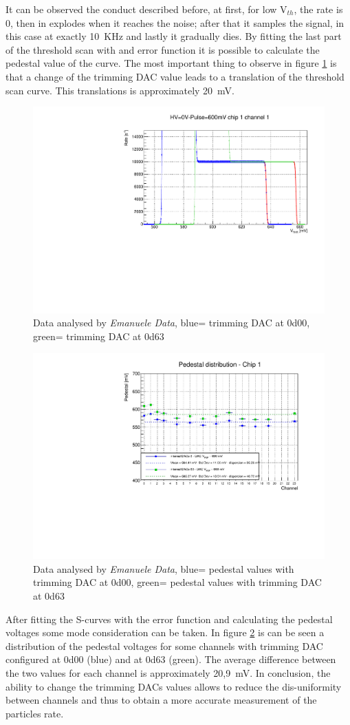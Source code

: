 It can be observed the conduct described before, at first, for low V$_{th}$, the rate is 0, then in explodes when it reaches the noise; after that it samples the signal, in this case at exactly 10~KHz and lastly it gradually dies. 
By fitting the last part of the threshold scan with and error function it is possible to calculate the pedestal value of the curve.
\noindent The most important thing to observe in figure \ref{fig:thscanch0} is that a change of the trimming DAC value leads to a translation of the threshold scan curve.
This translations is approximately 20~mV.
\begin{figure}[H]
	\centering
	\includegraphics[width=0.7\linewidth]{IMG/ch5/DataDacConfig/ThScan_ch0.pdf}
	\caption{Data analysed by \textit{Emanuele Data}, {\color{blue}blue}= trimming DAC at 0d00,\\{\color{green}green}= trimming DAC at 0d63}
	\label{fig:thscanch0}
\end{figure}

\begin{figure}[H]
	\centering
	\includegraphics[width=0.7\linewidth]{IMG/ch5/DataDacConfig/DAC_V_REF_600mv-Copia.pdf}
	\caption{Data analysed by \textit{Emanuele Data}, {\color{blue}blue}= pedestal values with trimming DAC at 0d00, {\color{green}green}= pedestal values with trimming DAC at 0d63}
	\label{fig:pedestal}
\end{figure}
\noindent After fitting the S-curves with the error function and calculating the pedestal voltages some mode consideration can be taken.
In figure \ref{fig:pedestal} is can be seen a distribution of the pedestal voltages for some channels with trimming DAC configured at 0d00 (blue) and at 0d63 (green).
The average difference between the two values for each channel is approximately 20,9~mV.
In conclusion, the ability to change the trimming DACs values allows to reduce the dis-uniformity between channels and thus to obtain a more accurate measurement of the particles rate.
\newpage

